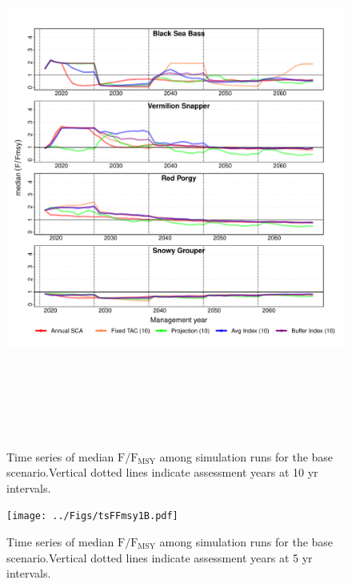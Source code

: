 \documentclass[12pt,english]{article}
\begin{document}
\clearpage\begin{figure}[!ht]
\begin{center}
\includegraphics[width=6in, height=7in]{../Figs/tsFFmsy1.pdf}
\end{center}
\begin{flushleft}
\caption{Time series of median $\mathrm{F/F_{MSY}}$ among simulation runs for the base scenario.Vertical dotted lines indicate assessment years at 10 yr intervals.}
\label{fig:tsFFmsy1}
\end{flushleft}
\end{figure}
\clearpage\begin{figure}[!ht]
\begin{center}
\texttt{[image: ../Figs/tsFFmsy1B.pdf]}
\end{center}
\begin{flushleft}
\caption{Time series of median $\mathrm{F/F_{MSY}}$ among simulation runs for the base scenario.Vertical dotted lines indicate assessment years at 5 yr intervals.}
\label{fig:tsFFmsy1B}
\end{flushleft}
\end{figure}
\end{document}
